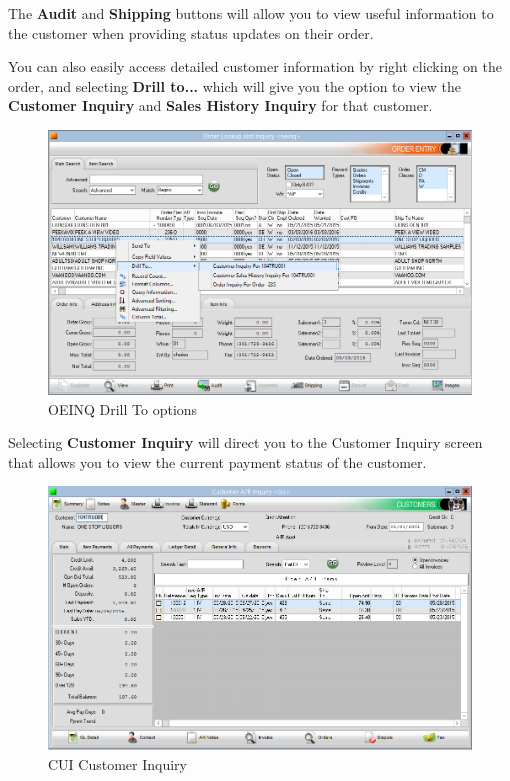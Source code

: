 The \textbf{Audit} and \textbf{Shipping} buttons will allow you to view useful information to the customer when providing status updates on their order.

You can also easily access detailed customer information by right clicking on the order, and selecting \textbf{Drill to...} which will give you the option to view the \textbf{Customer Inquiry} and \textbf{Sales History Inquiry} for that customer.

\begin{figure}[H]
	\includegraphics[width=\textwidth]{../img/image7}
	\caption{OEINQ Drill To options}
\end{figure}


Selecting \textbf{Customer Inquiry} will direct you to the Customer Inquiry screen that allows you to view the current payment status of the customer.

\begin{figure}[H]
	\includegraphics[width=\textwidth]{../img/image8}
	\caption{CUI Customer Inquiry}
\end{figure}


